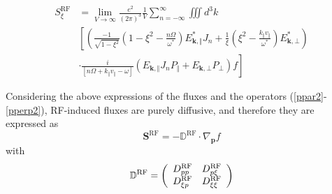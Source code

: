 \begin{align}
S_{\xi}^{\text{RF}}  &
=\lim_{V\rightarrow\infty}\frac{e^{2}}{\left( 2\pi\right)
^{3}}\frac{1}{V}\sum_{n=-\infty}^{\infty}\iiint
d^{3}k\nonumber\\&\left[
\left(  \frac{-1}{\sqrt{1-\xi^{2}}}\left(  1-\xi^{2}-\frac{n\Omega}%
{\omega^{\ast}}\right)  E_{\mathbf{k},\Vert}^{\ast}J_{n}+\frac{1}{\xi}\left(
\xi^{2}-\frac{k_{\Vert}v_{\Vert}}{\omega^{\ast}}\right)  E_{\mathbf{k},\bot
}^{\ast}\right)  \right. \nonumber\\
&  \left.  \cdot\frac{i}{\left[  n\Omega+k_{\Vert}v_{\Vert}-\omega\right]
}\left(  E_{\mathbf{k},\Vert}J_{n}P_{\Vert}+E_{\mathbf{k},\bot}P_{\bot
}\right)  f\right]  \label{fluxRFksi}%
\end{align}

Considering the above expressions of the fluxes and the operators
(\ref{ppar2}-\ref{pperp2}), RF-induced fluxes are purely diffusive, and
therefore they are expressed as
\begin{equation}
\mathbf{S}^{\text{RF}}=-\mathbb{{D}}^{\text{RF}}\cdot\nabla_{\mathbf{p}}f
\end{equation}
with
\begin{equation}
\mathbb{{D}}^{\text{RF}}=\left(
\begin{array}
[c]{ll}%
D_{pp}^{\text{RF}} & D_{p\xi}^{\text{RF}}\\
D_{\xi p}^{\text{RF}} & D_{\xi\xi}^{\text{RF}}%
\end{array}
\right)  \label{dtensor}%
\end{equation}

